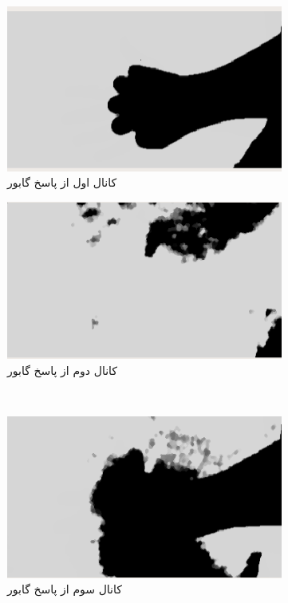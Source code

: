 \documentclass[11.5pt,a4paper]{article}
\begin{document}
\begin{figure}[h]
\center
	\begin{subfigure}{.4\textwidth}
		\includegraphics[scale=0.4]{Imgs/gabors1.png}
		\caption{کانال اول از پاسخ گابور}
	\end{subfigure}
	\begin{subfigure}{.4\textwidth}
		\includegraphics[scale=0.4]{Imgs/gabors2.png}
		\caption{کانال دوم از پاسخ گابور}
	\end{subfigure}
\\
	\begin{subfigure}{.4\textwidth}
		\includegraphics[scale=0.4]{Imgs/gabors3.png}
		\caption{کانال سوم از پاسخ گابور}
	\end{subfigure}
	\begin{subfigure}{.4\textwidth}

\end{subfigure}
\end{figure}
\end{document}
